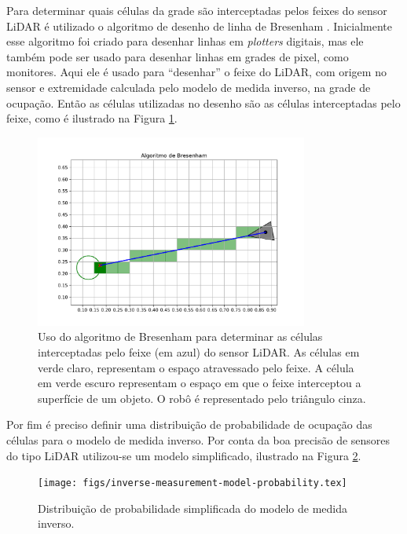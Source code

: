 Para determinar quais células da grade são interceptadas pelos feixes do 
sensor LiDAR é utilizado o algoritmo de desenho de linha 
de Bresenham \cite{bresenham1965algorithm}. Inicialmente 
esse algoritmo foi criado para desenhar linhas em \textit{plotters} 
digitais, mas ele também pode ser usado para desenhar linhas em grades de 
pixel, como monitores. Aqui ele é usado para ``desenhar'' o feixe do 
LiDAR, com origem no sensor e extremidade calculada pelo modelo de medida 
inverso, na grade de ocupação. Então as células utilizadas no desenho são 
as células interceptadas pelo feixe, como é ilustrado na Figura \ref{fig:bresenham-demo}.

\begin{figure}
  \centering
  \includegraphics[width=0.8\textwidth]{figs/bresenham_demop.pdf}
  \caption{Uso do algoritmo de Bresenham para determinar as células 
  interceptadas pelo feixe (em azul) do sensor LiDAR. As células em 
  verde claro, representam o espaço atravessado pelo feixe. A célula 
  em verde escuro representam o espaço em que o feixe interceptou a 
  superfície de um objeto. O robô é representado pelo triângulo cinza.}
  \label{fig:bresenham-demo}
\end{figure}

Por fim é preciso definir uma distribuição de probabilidade de ocupação 
das células para o modelo de medida inverso. Por conta da boa precisão 
de sensores do tipo LiDAR utilizou-se um modelo simplificado, ilustrado 
na Figura \ref{fig:simplified-inv-measurement-model}.

\begin{figure}
  \centering
  \texttt{[image: figs/inverse-measurement-model-probability.tex]}
  \caption{Distribuição de probabilidade simplificada do modelo de 
  medida inverso.}
  \label{fig:simplified-inv-measurement-model}
\end{figure}

